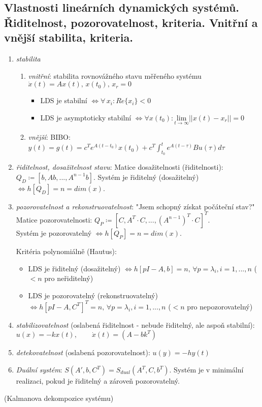 \subsection{Vlastnosti lineárních dynamických systémů. Řiditelnost, pozorovatelnost, kriteria. Vnitřní a vnější stabilita, kriteria.}
\begin{enumerate}[label=(\alph*)]
\item \textit{stabilita}
\begin{enumerate}[label=\alph*/]
\item \textit{vnitřní}: stabilita rovnovážného stavu měřeného systému $ \dot{x}(t) = Ax(t), \, x(t_0), \, x_r = 0 $
\begin{itemize}
\item LDS je stabilní $ \iff \forall \, x_i: Re\{x_i\} < 0 $
\item LDS je asymptoticky stabilní $ \iff \forall x(t_0): \underset{t \to \infty}{\mathrm{lim}} ||x(t)-x_r|| = 0 $
\end{itemize}
\item \textit{vnější}: BIBO: $ y(t) = g(t) = c^T e^{A(t-t_0)} x(t_0) + c^T \displaystyle{\int_{t_0}^t} e^{A(t-\tau)} Bu(\tau) d\tau $
\end{enumerate}
\item \textit{řiditelnost, dosažitelnost stavu}: Matice dosažitelnosti (řiditelnosti): $ Q_D \coloneqq [b, Ab, ..., A^{n-1}b] $. Systém je řiditelný (dosažitelný) $ \iff h[Q_D] = n = dim(x) $.
\vspace{2cm}
\item \textit{pozorovatelnost a rekonstruovatelnost}: "Jsem schopný získat počáteční stav?" Matice pozorovatelnosti: $ Q_P \coloneqq [C, A^T \cdot C, ..., (A^{n-1})^T \cdot C]^T $. \\ Systém je pozorovatelný $ \iff h[Q_P] = n = dim(x) $.
\vspace{2cm}

Kritéria polynomiálně (Hautus):
\begin{itemize}
\item LDS je řiditelný (dosažitelný) $ \iff h[pI-A,b] = n, \, \forall p=\lambda_i, i=1,...,n $ ($ < n $ pro neřiditelný)
\item LDS je pozorovatelný (rekonstruovatelný) $ \iff h[pI-A, C^T]^T = n, \, \forall p=\lambda_i, i=1,...,n $ ($ < n $ pro nepozorovatelný)
\end{itemize}
\item \textit{stabilizovatelnost} (oslabená řiditelnost - nebude řiditelný, ale aspoň stabilní): $ u(x) = -kx(t), \qquad \dot{x}(t) = (A-bk^T) $
\item \textit{detekovatelnost} (oslabená pozorovatelnost): $ u(y) = -hy(t) $
\item \textit{Duální systém}: $ S(A', b, C^T) = S_{dual}(A^T, C, b^T) $. Systém je v minimální realizaci, pokud je řiditelný a zároveň pozorovatelný.
\end{enumerate}
(Kalmanova dekompozice systému)

